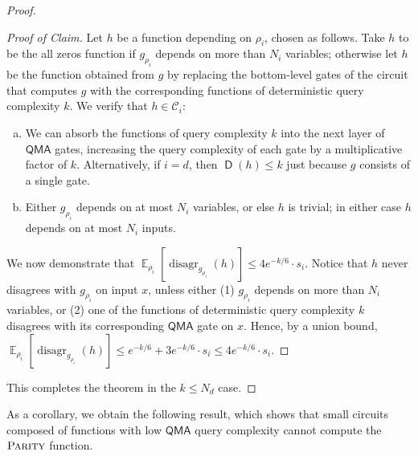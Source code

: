 \documentclass[11pt]{article}%
\newcommand{\E}{\mathop{\mathbb{E}}}
\newcommand{\PARITY}{\normalfont\textsc{Parity}}
\DeclareMathOperator{\disagr}{\mathrm{disagr}}
\DeclareMathOperator{\D}{\mathsf{D}}
\begin{document}
\begin{proof}
\begin{proof}[Proof of Claim]
Let $h$ be a function depending on $\rho_i$, chosen as follows. Take $h$ to be the all zeros function if $g_{\rho_i}$ depends on more than $N_i$ variables; otherwise let $h$ be the function obtained from $g$ by replacing the bottom-level gates of the circuit that computes $g$ with the corresponding functions of deterministic query complexity $k$. We verify that $h \in \mathcal{C}_i$:
\begin{enumerate}[(a)]
\item We can absorb the functions of query complexity $k$ into the next layer of $\mathsf{QMA}$ gates, increasing the query complexity of each gate by a multiplicative factor of $k$. Alternatively, if $i = d$, then $\D(h) \le k$ just because $g$ consists of a single gate.
\item Either $g_{\rho_i}$ depends on at most $N_i$ variables, or else $h$ is trivial; in either case $h$ depends on at most $N_i$ inputs.
\end{enumerate}
We now demonstrate that $\E_{\rho_i}\left[\disagr_{g_{\rho_i}}(h)\right] \le 4e^{-k/6} \cdot s_i$. Notice that $h$ never disagrees with $g_{\rho_i}$ on input $x$, unless either (1) $g_{\rho_i}$ depends on more than $N_i$ variables, or (2) one of the functions of deterministic query complexity $k$ disagrees with its corresponding $\mathsf{QMA}$ gate on $x$. Hence, by a union bound, $\E_{\rho_i}\left[\disagr_{g_{\rho_i}}(h)\right] \le e^{-k/6} + 3e^{-k/6} \cdot s_i \le 4e^{-k/6} \cdot s_i$.
\end{proof}
This completes the theorem in the $k \le N_d$ case.
\end{proof}

As a corollary, we obtain the following result, which shows that small circuits composed of functions with low $\mathsf{QMA}$ query complexity cannot compute the $\PARITY$ function.
\end{document}
